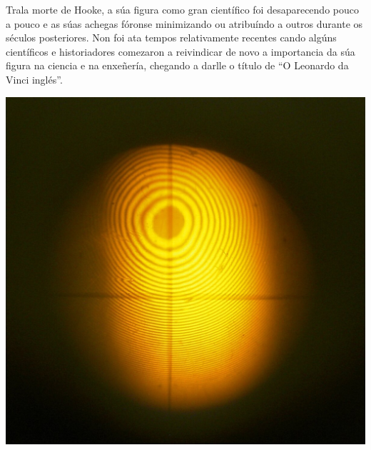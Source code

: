 \begin{refsection}
\begin{multicols}{2}
Trala morte de Hooke, a súa figura como gran científico foi desaparecendo pouco
a pouco e as súas achegas fóronse minimizando ou atribuíndo a outros durante os
séculos posteriores. Non foi ata tempos relativamente recentes cando algúns
científicos e historiadores comezaron a reivindicar de novo a importancia da
súa figura na ciencia e na enxeñería, chegando a darlle o título de ``O
Leonardo da Vinci inglés''.

\begin{center}
    \includegraphics[scale=0.2]{revistas/002/imaxes/Newton-rings}
\end{center}

\nocite{gribbin2004historia}
\printbibliography

\end{multicols}
\end{refsection}
